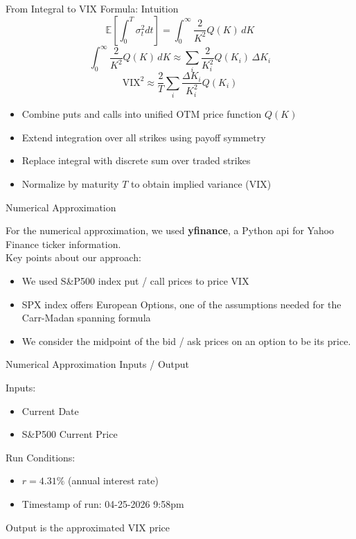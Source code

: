 \documentclass{beamer}
\begin{document}
\begin{frame}{From Integral to VIX Formula: Intuition}
\[
\mathbb{E}\left[\int_0^T \sigma_t^2 dt\right]
=
\int_0^\infty \frac{2}{K^2} Q(K)\, dK
\]
\[
\int_0^\infty \frac{2}{K^2} Q(K)\, dK
\approx
\sum_i \frac{2}{K_i^2} Q(K_i)\, \Delta K_i
\]
\[
\text{VIX}^2 \approx \frac{2}{T} \sum_i \frac{\Delta K_i}{K_i^2} Q(K_i)
\]

\begin{itemize}
\item Combine puts and calls into unified OTM price function $Q(K)$
\item Extend integration over all strikes using payoff symmetry
\item Replace integral with discrete sum over traded strikes
\item Normalize by maturity $T$ to obtain implied variance (VIX)
\end{itemize}
\end{frame}


\begin{frame}{Numerical Approximation}

For the numerical approximation, we used \textbf{yfinance}, a Python api for Yahoo Finance ticker information. \\

Key points about our approach: 
\begin{itemize}
    \item We used S\&P500 index put / call prices to price VIX 
    \item SPX index offers European Options, one of the assumptions needed for the Carr-Madan spanning formula  
    \item We consider the midpoint of the bid / ask prices on an option to be its price. 
\end{itemize}

\end{frame}


\begin{frame}{Numerical Approximation Inputs / Output}

Inputs: 

\begin{itemize}
\item Current Date
\item S\&P500 Current Price
\end{itemize}

Run Conditions:
\begin{itemize}
\item $r=4.31\%$ (annual interest rate)
\item Timestamp of run: 04-25-2026 9:58pm
\end{itemize}

Output is the approximated VIX price 

\end{frame}
\end{document}
